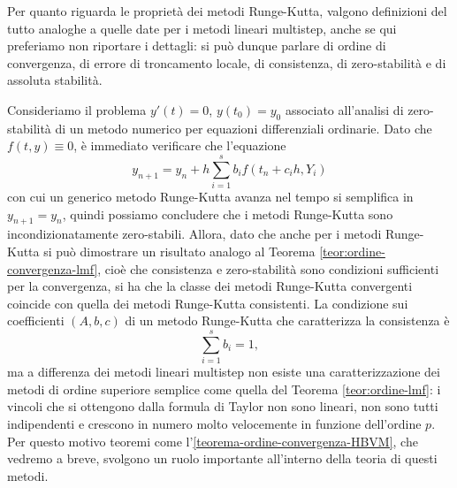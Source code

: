 Per quanto riguarda le proprietà dei metodi Runge-Kutta, valgono definizioni
del tutto analoghe a quelle date per i metodi lineari multistep, anche se
qui preferiamo non riportare i dettagli: si può dunque parlare di ordine
di convergenza, di errore di troncamento locale, di consistenza, di zero-stabilità
e di assoluta stabilità. %

Consideriamo il problema $y'(t) = 0$, $y(t_0) = y_0$ associato all'analisi
di zero-stabilità di un metodo numerico per equazioni differenziali ordinarie.
Dato che $f(t,y) \equiv 0$, è immediato verificare che l'equazione
\[
y_{n+1} = y_n + h \sum_{i=1}^s b_i f(t_n+c_i h, Y_i)
\]
con cui un generico metodo Runge-Kutta avanza nel tempo si semplifica in
$y_{n+1} = y_n$, quindi possiamo concludere che i metodi Runge-Kutta
sono incondizionatamente zero-stabili.
Allora, dato che anche per i metodi Runge-Kutta si può dimostrare un risultato
analogo al Teorema \ref{teor:ordine-convergenza-lmf}, cioè che consistenza
e zero-stabilità sono condizioni sufficienti per la convergenza, si ha che
la classe dei metodi Runge-Kutta convergenti coincide con quella
dei metodi Runge-Kutta consistenti.
La condizione sui coefficienti $(A,b,c)$ di un metodo Runge-Kutta che caratterizza
la consistenza è
\[
\sum_{i=1}^s b_i = 1,
\]
ma a differenza dei metodi lineari multistep non esiste una caratterizzazione
dei metodi di ordine superiore semplice come quella del Teorema \ref{teor:ordine-lmf}:
i vincoli che si ottengono dalla formula di Taylor non sono lineari, non sono
tutti indipendenti e crescono in numero molto velocemente in funzione
dell'ordine $p$.
Per questo motivo teoremi come l'\ref{teorema-ordine-convergenza-HBVM},
che vedremo a breve, svolgono un ruolo importante all'interno della teoria
di questi metodi.

